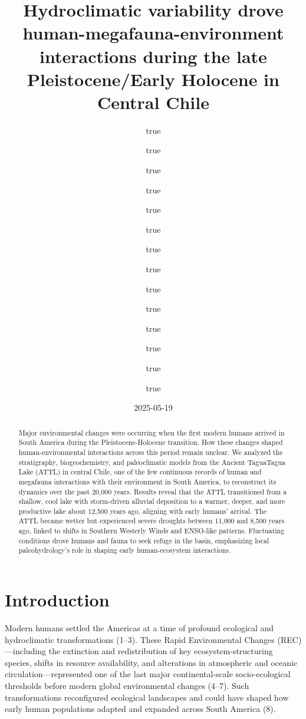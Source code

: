 \documentclass[
]{article}
\title{Hydroclimatic variability drove human-megafauna-environment
interactions during the late Pleistocene/Early Holocene in Central
Chile}
\author{true \and true \and true \and true \and true \and true \and true \and true \and true \and true \and true \and true \and true \and true}
\date{2025-05-19}
\begin{document}
\maketitle
\begin{abstract}
Major environmental changes were occurring when the first modern humans
arrived in South America during the Pleistocene-Holocene transition. How
these changes shaped human-environmental interactions across this period
remain unclear. We analyzed the stratigraphy, biogeochemistry, and
paleoclimatic models from the Ancient TaguaTagua Lake (ATTL) in central
Chile, one of the few continuous records of human and megafauna
interactions with their environment in South America, to reconstruct its
dynamics over the past 20,000 years. Results reveal that the ATTL
transitioned from a shallow, cool lake with storm-driven alluvial
deposition to a warmer, deeper, and more productive lake about 12,500
years ago, aligning with early humans' arrival. The ATTL became wetter
but experienced severe droughts between 11,000 and 8,500 years ago,
linked to shifts in Southern Westerly Winds and ENSO-like patterns.
Fluctuating conditions drove humans and fauna to seek refuge in the
basin, emphasizing local paleohydrology's role in shaping early
human-ecosystem interactions.
\end{abstract}

\section{Introduction}\label{introduction}

Modern humans settled the Americas at a time of profound ecological and
hydroclimatic transformations (1--3). These Rapid Environmental Changes
(REC)---including the extinction and redistribution of key
ecosystem-structuring species, shifts in resource availability, and
alterations in atmospheric and oceanic circulation---represented one of
the last major continental-scale socio-ecological thresholds before
modern global environmental changes (4--7). Such transformations
reconfigured ecological landscapes and could have shaped how early human
populations adapted and expanded across South America (8).
\end{document}
